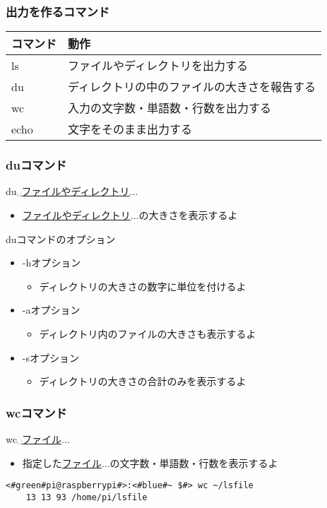 \begin{frame}
    \frametitle{出力を作るコマンド}
    \begin{tabular}{ll}
        コマンド & 動作                                         \\ \hline
        ls       & ファイルやディレクトリを出力する             \\
        du       & ディレクトリの中のファイルの大きさを報告する \\
        wc       & 入力の文字数・単語数・行数を出力する         \\
        echo     & 文字をそのまま出力する                       \\ \hline
    \end{tabular}
\end{frame}

\begin{frame}
    \frametitle{duコマンド}
    du␣\underline{ファイルやディレクトリ}$\ldots$
    \begin{itemize}
        \item \underline{ファイルやディレクトリ}$\ldots$の大きさを表示するよ
    \end{itemize}
    duコマンドのオプション
    \begin{itemize}
        \item  -hオプション
        \begin{itemize}
            \item ディレクトリの大きさの数字に単位を付けるよ
        \end{itemize}
        \item -aオプション
        \begin{itemize}
            \item ディレクトリ内のファイルの大きさも表示するよ
        \end{itemize}
        \item -sオプション
        \begin{itemize}
            \item ディレクトリの大きさの合計のみを表示するよ
        \end{itemize}
    \end{itemize}
\end{frame}

\begin{frame}[fragile]
    \frametitle{wcコマンド}
    wc␣\underline{ファイル}$\ldots$
    \begin{itemize}
        \item 指定した\underline{ファイル}$\ldots$の文字数・単語数・行数を表示するよ
    \end{itemize}
    \begin{lstlisting}[title=wcコマンドの実行例, label=wc_example]
    <#green#pi@raspberrypi#>:<#blue#~ $#> wc ~/lsfile
    13 13 93 /home/pi/lsfile
    \end{lstlisting}
\end{frame}

